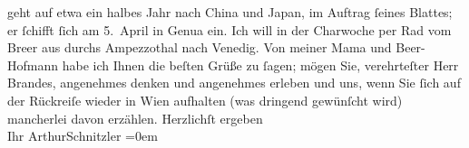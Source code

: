 \begin{ledgroupsized}[t]{13cm}
               geht auf etwa ein halbes Jahr nach China und Japan, im Auftrag ſeines Blattes; er ſchifft ſich am
                  5. April in Genua ein. Ich will
               in der Charwoche per Rad vom Bre{\geminationn}er aus durchs Ampezzothal
               nach Venedig.\pend
           \pstart
           Von meiner Mama und Beer-Hofmann habe ich Ihnen die beſten Grüße zu
               ſagen; {\pb}mögen Sie, verehrteſter Herr Brandes,
               angenehmes denken und angenehmes erleben und uns, wenn Sie ſich auf der Rückreiſe
               wieder in Wien aufhalten (was dringend gewünſcht
               wird) mancherlei davon erzählen.\pend
           \pstart
           Herzlichſt ergeben{\\[\baselineskip]}Ihr \spacefill\mbox{ArthurSchnitzler}\pend
           \leftskip=0em{}
         
         \endnumbering{}\end{ledgroupsized}  \newcommand{\dateiname}{L00787}\newcommand{\titel}{Arthur Schnitzler an Georg Brandes, 27. 3. 1898}\newcommand{\editorInnen}{Martin Anton Müller und Gerd-Hermann Susen}
      